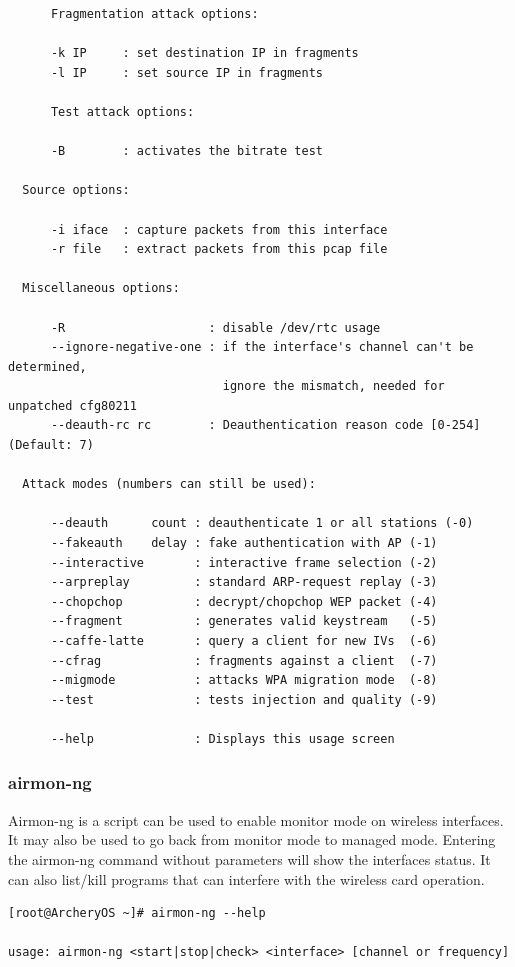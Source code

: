 \documentclass{article}
\begin{document}
\begin{lstlisting}
      Fragmentation attack options:

      -k IP     : set destination IP in fragments
      -l IP     : set source IP in fragments

      Test attack options:

      -B        : activates the bitrate test

  Source options:

      -i iface  : capture packets from this interface
      -r file   : extract packets from this pcap file

  Miscellaneous options:

      -R                    : disable /dev/rtc usage
      --ignore-negative-one : if the interface's channel can't be determined,
                              ignore the mismatch, needed for unpatched cfg80211
      --deauth-rc rc        : Deauthentication reason code [0-254] (Default: 7)

  Attack modes (numbers can still be used):

      --deauth      count : deauthenticate 1 or all stations (-0)
      --fakeauth    delay : fake authentication with AP (-1)
      --interactive       : interactive frame selection (-2)
      --arpreplay         : standard ARP-request replay (-3)
      --chopchop          : decrypt/chopchop WEP packet (-4)
      --fragment          : generates valid keystream   (-5)
      --caffe-latte       : query a client for new IVs  (-6)
      --cfrag             : fragments against a client  (-7)
      --migmode           : attacks WPA migration mode  (-8)
      --test              : tests injection and quality (-9)

      --help              : Displays this usage screen
\end{lstlisting}

\subsubsection{airmon-ng}
Airmon-ng is a script can be used  to  enable  monitor  mode  on  wireless interfaces.  It  may  also be used to go back from monitor mode to managed mode. Entering the airmon-ng command  without  parameters  will  show  the interfaces status.  It can also list/kill programs that can interfere with the wireless card operation.
\begin{lstlisting}
[root@ArcheryOS ~]# airmon-ng --help

usage: airmon-ng <start|stop|check> <interface> [channel or frequency]
\end{lstlisting}
\end{document}
